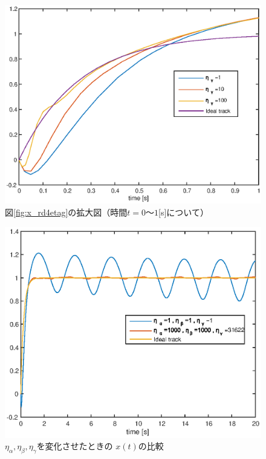 \documentclass[a4paper,12pt]{jarticle}
\begin{document}
%
%
\begin{figure}[p]
    \begin{center}
	 \includegraphics[width=180mm]{fig/x_rd4_Etag_2.eps}
        \caption{図\ref{fig:x_rd4etag}の拡大図（時間$t=0〜1$[s]について）}
        \label{fig:x_rd4etag2}
    \end{center}
\end{figure}
%
%
\begin{figure}[htb]
    \begin{center}
	 \includegraphics[width=140mm]{fig/x_rd4_eta_reform.eps}
	 \caption{$\eta_\alpha,\eta_\beta,\eta_\gamma$を変化させたときの
	 $x(t)$の比較}
        \label{fig:x_rd4_eta_reform}
    \end{center}
\end{figure}
\end{document}
